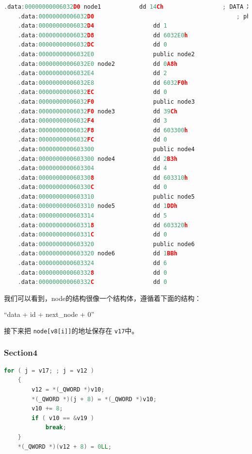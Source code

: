 \documentclass[a4pper,12pt,onecolumn]{article}
\begin{document}
\begin{lstlisting}[language=c]
    .data:00000000006032D0 node1           dd 14Ch                 ; DATA XREF: phase_6:loc_401183↑o
    .data:00000000006032D0                                         ; phase_6+B0↑o
    .data:00000000006032D4                 dd 1
    .data:00000000006032D8                 dd 6032E0h
    .data:00000000006032DC                 dd 0
    .data:00000000006032E0                 public node2
    .data:00000000006032E0 node2           dd 0A8h
    .data:00000000006032E4                 dd 2
    .data:00000000006032E8                 dd 6032F0h
    .data:00000000006032EC                 dd 0
    .data:00000000006032F0                 public node3
    .data:00000000006032F0 node3           dd 39Ch
    .data:00000000006032F4                 dd 3
    .data:00000000006032F8                 dd 603300h
    .data:00000000006032FC                 dd 0
    .data:0000000000603300                 public node4
    .data:0000000000603300 node4           dd 2B3h
    .data:0000000000603304                 dd 4
    .data:0000000000603308                 dd 603310h
    .data:000000000060330C                 dd 0
    .data:0000000000603310                 public node5
    .data:0000000000603310 node5           dd 1DDh
    .data:0000000000603314                 dd 5
    .data:0000000000603318                 dd 603320h
    .data:000000000060331C                 dd 0
    .data:0000000000603320                 public node6
    .data:0000000000603320 node6           dd 1BBh
    .data:0000000000603324                 dd 6
    .data:0000000000603328                 dd 0
    .data:000000000060332C                 dd 0
\end{lstlisting}

我们可以看到，node的结构很像一个结构体，遵循着下面的结构：

``data + id + next\_node + 0''

接下来把  \texttt{node[v8[i]]}的地址保存在 \texttt{v17}中。

\subsubsection{Section4}

\begin{lstlisting}[language=c]
    for ( j = v17; ; j = v12 )
    {
        v12 = *(_QWORD *)v10;
        *(_QWORD *)(j + 8) = *(_QWORD *)v10;
        v10 += 8;
        if ( v10 == &v19 )
            break;
    }
    *(_QWORD *)(v12 + 8) = 0LL;
\end{lstlisting}
\end{document}
